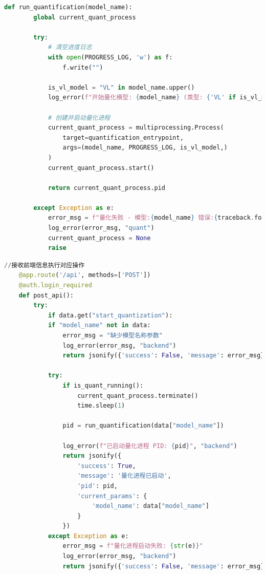 \documentclass[AutoFakeBold,AutoFakeSlant,language=chinese,degree=bachelor]{sustechthesis}
\begin{document}
\begin{itemize}
\begin{lstlisting}[language=python]
    def run_quantification(model_name):
        global current_quant_process
    
        try:
            # 清空进度日志
            with open(PROGRESS_LOG, 'w') as f:
                f.write("")
            
            is_vl_model = "VL" in model_name.upper()
            log_error(f"开始量化模型: {model_name} (类型: {'VL' if is_vl_model else '普通'})", "quant")
    
            # 创建并启动量化进程
            current_quant_process = multiprocessing.Process(
                target=quantification_entrypoint,
                args=(model_name, PROGRESS_LOG, is_vl_model,)
            )
            current_quant_process.start()
    
            return current_quant_process.pid
        
        except Exception as e:
            error_msg = f"量化失败 - 模型:{model_name} 错误:{traceback.format_exc()}"
            log_error(error_msg, "quant")
            current_quant_process = None
            raise
    \end{lstlisting}
    \begin{lstlisting}[language=python]
    //接收前端信息执行对应操作
    @app.route('/api', methods=['POST'])
    @auth.login_required
    def post_api():
        try:
            if data.get("start_quantization"):
            if "model_name" not in data:
                error_msg = "缺少模型名称参数"
                log_error(error_msg, "backend")
                return jsonify({'success': False, 'message': error_msg}), 400
            
            try:
                if is_quant_running():
                    current_quant_process.terminate()
                    time.sleep(1) 
                
                pid = run_quantification(data["model_name"])
                
                log_error(f"已启动量化进程 PID: {pid}", "backend")
                return jsonify({
                    'success': True,
                    'message': '量化进程已启动',
                    'pid': pid,
                    'current_params': {
                        'model_name': data["model_name"]
                    }
                })
            except Exception as e:
                error_msg = f"量化进程启动失败: {str(e)}"
                log_error(error_msg, "backend")
                return jsonify({'success': False, 'message': error_msg}), 500
                

\end{lstlisting}
\end{itemize}
\end{document}
